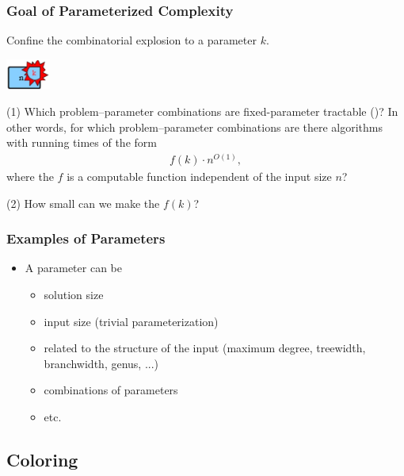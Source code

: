 \begin{frame}
 \frametitle{Goal of Parameterized Complexity}

 \noindent
 Confine the combinatorial explosion to a parameter $k$.\\
 \smallskip

 \begin{center}
  \includegraphics[height=1cm]{pc.jpg}
 \end{center}

 \smallskip
 \noindent
 (1) Which problem--parameter combinations are fixed-parameter tractable (\FPT)? In other words, for which problem--parameter combinations are there algorithms with running times of the form
 \begin{align*}
  f(k) \cdot n^{O(1)},
 \end{align*}
 where the $f$ is a computable function independent of the input size $n$?
 
 \smallskip
 \noindent
 (2) How small can we make the $f(k)$?

\end{frame}


\begin{frame}
 \frametitle{Examples of Parameters}


  \bigskip
  \begin{itemize}
   \item A parameter can be
   \begin{itemize}
    \item solution size
    \item input size (trivial parameterization)
    \item related to the structure of the input (maximum degree, treewidth, branchwidth, genus, ...)
    \item combinations of parameters
    \item etc.
   \end{itemize}
  \end{itemize}

\end{frame}

\subsection{Coloring}

